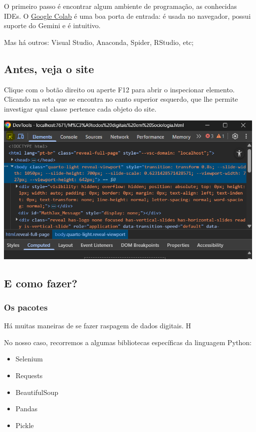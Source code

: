 \documentclass[
  brazilian,
  letterpaper,
  DIV=11,
  numbers=noendperiod]{scrartcl}
\providecommand{\tightlist}{%
  \setlength{\itemsep}{0pt}\setlength{\parskip}{0pt}}
\begin{document}
O primeiro passo é encontrar algum ambiente de programação, as
conhecidas IDEs. O \href{https://colab.google/}{Google Colab} é uma boa
porta de entrada: é usada no navegador, possui suporte do Gemini e é
intuitivo.

Mas há outros: Visual Studio, Anaconda, Spider, RStudio, etc;

\subsection{Antes, veja o site}\label{antes-veja-o-site}

Clique com o botão direito ou aperte F12 para abrir o inspecionar
elemento. Clicando na seta que se encontra no canto superior esquerdo,
que lhe permite investigar qual classe pertence cada objeto do site.

\includegraphics[width=52.08333in,height=\textheight,keepaspectratio]{Inspecionar.png}

\subsection{E como fazer?}\label{e-como-fazer-1}

\subsubsection{Os pacotes}

Há muitas maneiras de se fazer raspagem de dados digitais. H

No nosso caso, recorremos a algumas bibliotecas específicas da linguagem
Python:

\begin{itemize}
\tightlist
\item
  Selenium
\item
  Requests
\item
  BeautifulSoup
\item
  Pandas
\item
  Pickle
\end{itemize}
\end{document}
